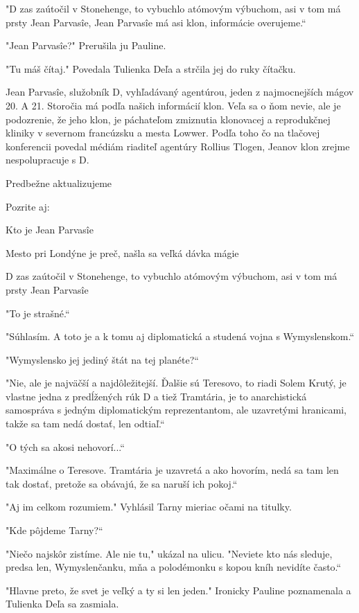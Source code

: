 \documentclass{book}
\begin{document}
"$ $D zas zaútočil v Stonehenge, to vybuchlo atómovým výbuchom, asi v tom má prsty Jean Parvasîe, Jean Parvasîe má asi klon, informácie overujeme.“

"$ $Jean Parvasîe?"$ $ Prerušila ju Pauline.

"$ $Tu máš čítaj."$ $ Povedala Tulienka Deľa a strčila jej do ruky čítačku. 

Jean Parvasîe, služobník D, vyhľadávaný agentúrou, jeden z najmocnejších mágov 20. A 21. Storočia má podľa našich informácií klon. Veľa sa o ňom nevie, ale je podozrenie, že jeho klon, je páchateľom zmiznutia klonovacej a reprodukčnej kliniky v severnom francúzsku a mesta Lowwer. Podľa toho čo na tlačovej konferencii povedal médiám riaditeľ agentúry Rollius Tlogen, Jeanov klon zrejme nespolupracuje s D.

Predbežne aktualizujeme

Pozrite aj:

Kto je Jean Parvasîe

Mesto pri Londýne je preč, našla sa veľká dávka mágie

D zas zaútočil v Stonehenge, to vybuchlo atómovým výbuchom, asi v tom má prsty Jean Parvasîe

"$ $To je strašné.“

"$ $Súhlasím. A toto je a k tomu aj diplomatická a studená vojna s Wymyslenskom.“

"$ $Wymyslensko jej jediný štát na tej planéte?“

"$ $Nie, ale je najväčší a najdôležitejší. Ďalšie sú Teresovo, to riadi Solem Krutý, je vlastne jedna z predĺžených rúk D a tiež Tramtária, je to anarchistická samospráva s jedným diplomatickým reprezentantom, ale uzavretými hranicami, takže sa tam nedá dostať, len odtiaľ.“

"$ $O tých sa akosi nehovorí...“

"$ $Maximálne o Teresove. Tramtária je uzavretá a ako hovorím, nedá sa tam len tak dostať, pretože sa obávajú, že sa naruší ich pokoj.“

"$ $Aj im celkom rozumiem."$ $ Vyhlásil Tarny mieriac očami na titulky.

"$ $Kde pôjdeme Tarny?“

"$ $Niečo najskôr zistíme. Ale nie tu,"$ $ ukázal na ulicu. "$ $Neviete kto nás sleduje, predsa len, Wymyslenčanku, mňa a polodémonku s kopou kníh nevidíte často.“

"$ $Hlavne preto, že svet je veľký a ty si len jeden."$ $ Ironicky Pauline poznamenala a Tulienka Deľa sa zasmiala.
\end{document}
